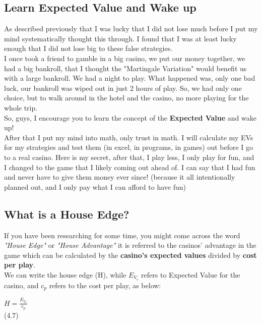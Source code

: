 \documentclass{article}
\begin{document}
\subsection{Learn Expected Value and Wake up}

As described previously that I was lucky that I did not lose much before I put my mind systematically thought this through.  I found that I was at least lucky enough that I did not lose big to these false strategies.  \\

I once took a friend to gamble in a big casino, we put our money together, we had a big bankroll, that I thought the "Martingale Variation" would benefit us with a large bankroll.  We had a night to play.  What happened was, only one bad luck, our bankroll was wiped out in just 2 hours of play.  So, we had only one choice, but to walk around in the hotel and the casino, no more playing for the whole trip.\\

So, guys, I encourage you to learn the concept of the \textbf{Expected Value} and wake up!\\

After that I put my mind into math, only trust in math.  I will calculate my EVs for my strategies and test them (in excel, in programs, in games) out before I go to a real casino.  Here is my secret, after that, I play less, I only play for fun, and I changed to the game that I likely coming out ahead of.  I can say that I had fun and never have to give them money ever since! (because it all intentionally planned out, and I only pay what I can afford to have fun)\\

\subsection{What is a House Edge?}
If you have been researching for some time, you might come across the word \emph{"House Edge"} or \emph{"House Advantage"} it is referred to the casinos' advantage in the game which can be calculated by the \textbf{casino's expected values} divided by \textbf{cost per play}. \\ 

We can write the house edge (H), while $E_{V_c}$ refers to Expected Value for the casino, and $c_p$ refers to the cost per play, as below:\par
\begin{center}
$H=\frac{E_{V_c}}{c_p}$\\
(4.7)\\
\end{center}
\end{document}
